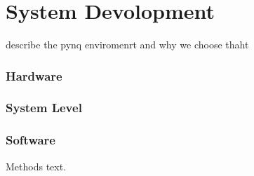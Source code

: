 \chapter{System Devolopment}
\todo[inline] describe the pynq enviromenrt and why we choose thaht
\subsection{Hardware}

\subsection{System Level}
 
\subsection{Software}
Methods text.